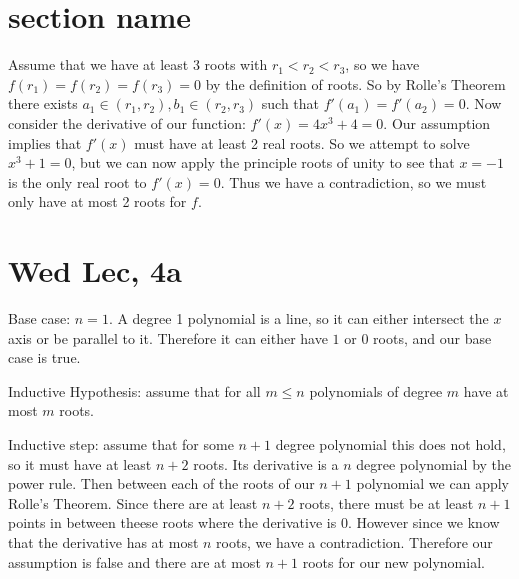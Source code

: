 \documentclass[12pt]{article}
\begin{document}
\section{section name}
Assume that we have at least 3 roots with $r_1 < r_2 < r_3$, so we have $f(r_1)=f(r_2)=f(r_3)=0$ by the definition of roots. So by Rolle's Theorem there exists $a_1 \in (r_1, r_2), b_1 \in (r_2, r_3)$ such that $f'(a_1)=f'(a_2)=0$.
\newline
Now consider the derivative of our function: $f'(x)=4x^3+4=0$. Our assumption implies that $f'(x)$ must have at least 2 real roots. So we attempt to solve $x^3+1=0$, but we can now apply the principle roots of unity to see that $x=-1$ is the only real root to $f'(x)=0$. Thus we have a contradiction, so we must only have at most 2 roots for $f$.

\section{Wed Lec, 4a}
Base case: $n=1$. A degree 1 polynomial is a line, so it can either intersect the $x$ axis or be parallel to it. Therefore it can either have $1$ or $0$ roots, and our base case is true.
\newline

Inductive Hypothesis: assume that for all $m \leq n$ polynomials of degree $m$ have at most $m$ roots.
\newline

Inductive step: assume that for some $n+1$ degree polynomial this does not hold, so it must have at least $n+2$ roots. Its derivative is a $n$ degree polynomial by the power rule. Then between each of the roots of our $n+1$ polynomial we can apply Rolle's Theorem. Since there are at least $n+2$ roots, there must be at least $n+1$ points in between theese roots where the derivative is 0. However since we know that the derivative has at most $n$ roots, we have a contradiction. Therefore our assumption is false and there are at most $n+1$ roots for our new polynomial.
\end{document}
